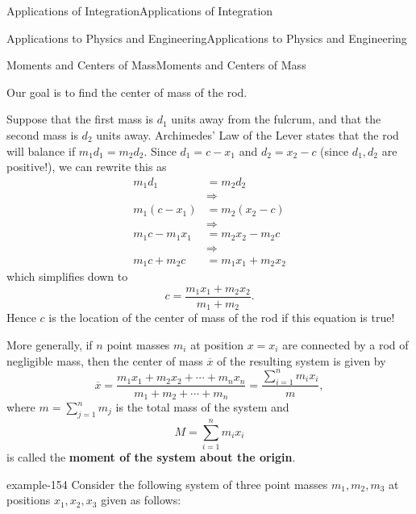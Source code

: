 \documentclass[10pt,]{book}
\newcommand{\terminology}[1]{\textbf{#1}}
\numberwithin{equation}{section}
\newcommand{\amp}{&}
\begin{document}
\begin{chapterptx}{Applications of Integration}{}{Applications of Integration}{}{}
\begin{sectionptx}{Applications to Physics and Engineering}{}{Applications to Physics and Engineering}{}{}
\begin{subsectionptx}{Moments and Centers of Mass}{}{Moments and Centers of Mass}{}{}
\begin{figure}
{
}
\end{figure}
\hypertarget{p-689}{}%
Our goal is to find the center of mass of the rod.%
\par
\hypertarget{p-690}{}%
Suppose that the first mass is \(d_{1}\) units away from the fulcrum, and that the second mass is \(d_{2}\) units away. Archimedes' Law of the Lever states that the rod will balance if \(m_{1}d_{1} = m_{2}d_{2}\). Since \(d_{1} = c - x_{1}\) and \(d_{2} = x_{2} - c\) (since \(d_{1},d_{2}\) are positive!), we can rewrite this as%
\begin{align*}
m_{1}d_{1} \amp= m_{2}d_{2}\\
\amp\Rightarrow\\
m_{1}(c-x_{1}) \amp= m_{2}(x_{2}-c)\\
\amp\Rightarrow\\
m_{1}c-m_{1}x_{1} \amp= m_{2}x_{2} - m_{2}c\\
\amp\Rightarrow\\
m_{1}c+m_{2}c \amp= m_{1}x_{1}+m_{2}x_{2}
\end{align*}
which simplifies down to%
\begin{equation*}
c = \frac{m_{1}x_{1}+m_{2}x_{2}}{m_{1}+m_{2}}.
\end{equation*}
Hence \(c\) is the location of the center of mass of the rod if this equation is true!%
\par
\hypertarget{p-691}{}%
More generally, if \(n\) point masses \(m_{i}\) at position \(x=x_{i}\) are connected by a rod of negligible mass, then the center of mass \(\overline{x}\) of the resulting system is given by%
\begin{equation*}
\overline{x} = \frac{m_{1}x_{1}+m_{2}x_{2}+\cdots+m_{n}x_{n}}{m_{1}+m_{2}+\cdots+m_{n}} = \frac{\sum_{i=1}^{n}m_{i}x_{i}}{m},
\end{equation*}
where \(m = \sum_{j=1}^{n}m_{j}\) is the total mass of the system and%
\begin{equation*}
M = \sum_{i=1}^{n}m_{i}x_{i}
\end{equation*}
is called the \terminology{moment of the system about the origin}.%
\begin{example}{}{example-154}%
\hypertarget{p-692}{}%
Consider the following system of three point masses \(m_{1},m_{2},m_{3}\) at positions \(x_{1},x_{2},x_{3}\) given as follows:%
\par
\hypertarget{p-693}{}%

\end{example}
\end{subsectionptx}
\end{sectionptx}
\end{chapterptx}
\end{document}
